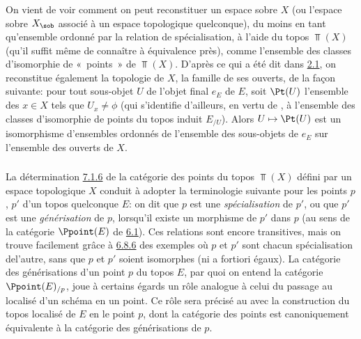 \documentclass[10pt]{../fichiers-configuration-latex/smfart}
\begin{document}
\subsubsection{}
On vient de voir comment on peut reconstituer un espace sobre $X$
(ou l'espace sobre $X_{\sob}$ associé à un espace topologique
quelconque), du moins en tant qu'ensemble ordonné par la relation de
spécialisation, à l'aide du topos $\Top(X)$ (qu'il suffit même de
connaître à équivalence près), comme l'ensemble des classes
d'isomorphie de « points »  de $\Top(X)$. D'après ce qui a été
dit dans \hyperref[IV.subsec2.1]{2.1}, on reconstitue également la topologie
de $X$, \ie la famille de ses ouverts, de la façon suivante: pour
tout sous-objet $U$ de l'objet final $e_E$ de $E$, soit $\Pt(U)$
l'ensemble des $x\in X$ tels que $U_x\neq\phi$ (qui s'identifie
d'ailleurs, en vertu de , à l'ensemble des classes
d'isomorphie de points du topos induit $E_{/U}$). Alors $U\mapsto
\Pt(U)$ est un isomorphisme d'ensembles ordonnés de l'ensemble des
sous-objets de $e_E$ sur l'ensemble des ouverts de $X$.

\subsubsection{}
La détermination \hyperref[IV.subsubsec7.1.6]{7.1.6} de la catégorie des points
du topos $\Top(X)$ défini par un espace topologique $X$ conduit à
adopter la terminologie suivante pour les points $p$, $p'$ d'un
topos quelconque $E$: on dit que $p$ est une \emph{spécialisation}
de $p'$, ou que $p'$ est une \emph{générisation} de $p$, lorsqu'il
existe un morphisme de $p'$ dans $p$ (au sens de la catégorie
$\Ppoint(E)$ de \hyperref[IV.def6.1]{6.1}). Ces relations sont encore
transitives, mais on trouve facilement grâce à
\hyperref[IV.subsubsec6.8.6]{6.8.6} des exemples où $p$ et $p'$ sont chacun
spécialisation de\pageoriginale l'autre, sans que $p$ et $p'$ soient
isomorphes (ni a fortiori égaux). La catégorie des
générisations
d'un point $p$ du topos $E$, par quoi on entend la catégorie
$\Ppoint(E)_{/p}$, joue à certains égards un rôle analogue à celui
du passage au localisé d'un schéma en un point. Ce rôle sera
précisé
au  avec la construction du topos localisé de $E$ en le
point $p$, dont la catégorie des points est canoniquement
équivalente à la catégorie des générisations de $p$.
\end{document}
